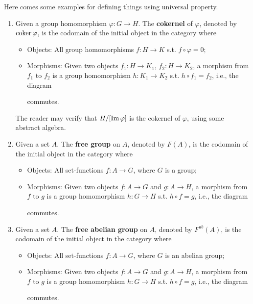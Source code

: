 \begin{example}Here comes some examples for defining things using universal property.
	\begin{enumerate}[label=(\roman*)]
		\item Given a group homomorphism $\varphi:G\to H$. The \textbf{cokernel} of $\varphi$, denoted by $\operatorname{coker} \varphi$, is the codomain of the initial object in the category where
			\begin{itemize}
				\item Objects: All group homomorphisms $f:H\to K$ s.t. $f\circ \varphi=0$;
				\item Morphisms: Given two objects $f_1:H\to K_1$, $f_2:H\to K_2$, a morphism from $f_1$ to $f_2$ is a group homomorphism $h:K_1\to K_2$ s.t. $h\circ f_1=f_2$, i.e., the diagram 
			commutes.
			\end{itemize}
		The reader may verify that $H/[\operatorname{Im}\varphi]$ is the cokernel of $\varphi$, using some abstract algebra. 
		\item Given a set $A$. The \textbf{free group} on $A$, denoted by $F(A)$, is the codomain of the initial object in the category where
			\begin{itemize}
				\item Objects: All set-functions $f:A\to G$, where $G$ is a group;
				\item Morphisms: Given two objects $f:A\to G$ and $g:A\to H$, a morphism from $f$ to $g$ is a group homomorphism $h:G\to H$ s.t. $h\circ f=g$, i.e., the diagram
				commutes.
			\end{itemize}
		\item Given a set $A$. The \textbf{free abelian group} on $A$, denoted by $F^{ab}(A)$, is the codomain of the initial object in the category where
			\begin{itemize}
				\item Objects: All set-functions $f:A\to G$, where $G$ is an abelian group;
				\item Morphisms: Given two objects $f:A\to G$ and $g:A\to H$, a morphism from $f$ to $g$ is a group homomorphism $h:G\to H$ s.t. $h\circ f=g$, i.e., the diagram
				commutes.
			\end{itemize}


\end{enumerate}
\end{example}
